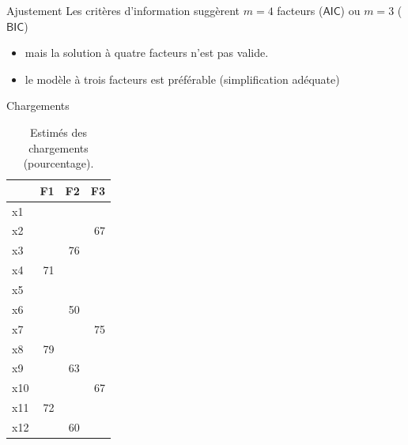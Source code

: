 \documentclass[
  ignorenonframetext,
]{beamer}
\newenvironment{Shaded}{\begin{snugshade}}{\end{snugshade}}
\newcommand{\AttributeTok}[1]{\textcolor[rgb]{0.40,0.45,0.13}{#1}}
\newcommand{\CommentTok}[1]{\textcolor[rgb]{0.37,0.37,0.37}{#1}}
\newcommand{\FloatTok}[1]{\textcolor[rgb]{0.68,0.00,0.00}{#1}}
\newcommand{\FunctionTok}[1]{\textcolor[rgb]{0.28,0.35,0.67}{#1}}
\newcommand{\NormalTok}[1]{\textcolor[rgb]{0.00,0.23,0.31}{#1}}
\newcommand{\OtherTok}[1]{\textcolor[rgb]{0.00,0.23,0.31}{#1}}
\newcommand{\SpecialCharTok}[1]{\textcolor[rgb]{0.37,0.37,0.37}{#1}}
\providecommand{\tightlist}{%
  \setlength{\itemsep}{0pt}\setlength{\parskip}{0pt}}\usepackage{longtable,booktabs,array}
\begin{document}
\begin{frame}[fragile]{Ajustement}
\protect\hypertarget{ajustement}{}
Les critères d'information suggèrent \(m=4\) facteurs (\(\mathsf{AIC}\))
ou \(m=3\) (\(\mathsf{BIC}\))

\begin{itemize}
\tightlist
\item
  mais la solution à quatre facteurs n'est pas valide.
\item
  le modèle à trois facteurs est préférable (simplification adéquate)
\end{itemize}

\begin{Shaded}
\end{Shaded}
\end{frame}

\begin{frame}{Chargements}
\protect\hypertarget{chargements-1}{}
\hypertarget{tbl-factanal3}{}
\begin{table}
\caption{\label{tbl-factanal3}Estimés des chargements (pourcentage). }\tabularnewline

\centering
\begin{tabular}{lrrr}
\toprule
  & F1 & F2 & F3\\
\midrule
x1 &  &  & \\
x2 &  &  & 67\\
x3 &  & 76 & \\
x4 & 71 &  & \\
x5 &  &  & \\
\addlinespace
x6 &  & 50 & \\
x7 &  &  & 75\\
x8 & 79 &  & \\
x9 &  & 63 & \\
x10 &  &  & 67\\
\addlinespace
x11 & 72 &  & \\
x12 &  & 60 & \\
\bottomrule
\end{tabular}
\end{table}
\end{frame}
\end{document}
